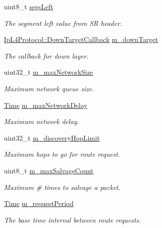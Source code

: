 \begin{DoxyCompactItemize}
uint8\+\_\+t \hyperlink{classns3_1_1dsr_1_1DsrRouting_a2089307bfbe378b6cd8b274b38f70bb9}{segs\+Left}
\begin{DoxyCompactList}\small\item\em The segment left value from SR header. \end{DoxyCompactList}\item 
\hyperlink{classns3_1_1IpL4Protocol_ae3ba76c0a48fbaa90529c528a15f12b6}{Ip\+L4\+Protocol\+::\+Down\+Target\+Callback} \hyperlink{classns3_1_1dsr_1_1DsrRouting_aa1eb6ea60fdf9ba2cac2079a74ce1ca4}{m\+\_\+down\+Target}
\begin{DoxyCompactList}\small\item\em The callback for down layer. \end{DoxyCompactList}\item 
uint32\+\_\+t \hyperlink{classns3_1_1dsr_1_1DsrRouting_ab2edb0a37a59600e15dbb91b5683ad25}{m\+\_\+max\+Network\+Size}
\begin{DoxyCompactList}\small\item\em Maximum network queue size. \end{DoxyCompactList}\item 
\hyperlink{classns3_1_1Time}{Time} \hyperlink{classns3_1_1dsr_1_1DsrRouting_a5bf0e688251f1587471745f4355203c1}{m\+\_\+max\+Network\+Delay}
\begin{DoxyCompactList}\small\item\em Maximum network delay. \end{DoxyCompactList}\item 
uint32\+\_\+t \hyperlink{classns3_1_1dsr_1_1DsrRouting_acf9cc5a2ae446403b8b57f3340fac178}{m\+\_\+discovery\+Hop\+Limit}
\begin{DoxyCompactList}\small\item\em Maximum hops to go for route request. \end{DoxyCompactList}\item 
uint8\+\_\+t \hyperlink{classns3_1_1dsr_1_1DsrRouting_a89f7e66d9f1bd83433b004876acf4a45}{m\+\_\+max\+Salvage\+Count}
\begin{DoxyCompactList}\small\item\em Maximum \# times to salvage a packet. \end{DoxyCompactList}\item 
\hyperlink{classns3_1_1Time}{Time} \hyperlink{classns3_1_1dsr_1_1DsrRouting_acb19e2fe8a4cc1812181cdd5491383ee}{m\+\_\+request\+Period}
\begin{DoxyCompactList}\small\item\em The base time interval between route requests. \end{DoxyCompactList}\item 

\end{DoxyCompactItemize}

